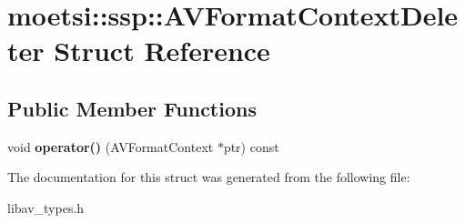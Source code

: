 \hypertarget{structmoetsi_1_1ssp_1_1AVFormatContextDeleter}{}\section{moetsi\+:\+:ssp\+:\+:A\+V\+Format\+Context\+Deleter Struct Reference}
\label{structmoetsi_1_1ssp_1_1AVFormatContextDeleter}
\subsection*{Public Member Functions}
\begin{DoxyCompactItemize}
\item 
\mbox{\label{structmoetsi_1_1ssp_1_1AVFormatContextDeleter_ac4683f844faec5ca273926ce715773df}} 
void {\bfseries operator()} (A\+V\+Format\+Context $\ast$ptr) const
\end{DoxyCompactItemize}


The documentation for this struct was generated from the following file\+:\begin{DoxyCompactItemize}
\item 
libav\+\_\+types.\+h\end{DoxyCompactItemize}
